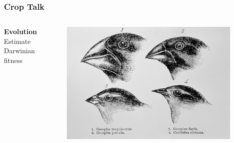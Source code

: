 \documentclass[table]{beamer}
\begin{document}
\begin{frame}
\frametitle{Crop Talk} %
\begin{columns}[t] %

  \textbf{Evolution}\\
  Estimate Darwinian fitness
\begin{figure}
\includegraphics[width=0.8\linewidth]{finches.jpg}
\end{figure}

% 
\end{columns}
\end{frame}



\end{document}
